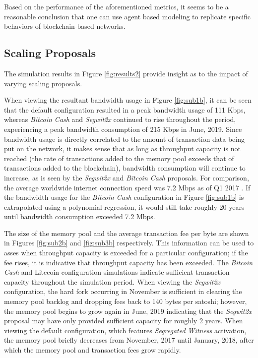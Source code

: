 \documentclass[12pt]{report}
\begin{document}
Based on the performance of the aforementioned metrics, it seems to be a reasonable conclusion that one can use agent based modeling to replicate specific behaviors of blockchain-based networks.

\subsection{Scaling Proposals}
\label{sec:scal}
The simulation results in Figure \ref{fig:results2} provide insight as to the impact of varying scaling proposals.

When viewing the resultant bandwidth usage in Figure \ref{fig:sub1b}, it can be seen that the default configuration resulted in a peak bandwidth usage of 111 Kbps, whereas \textit{Bitcoin Cash} and \textit{Segwit2x} continued to rise throughout the period, experiencing a peak bandwidth consumption of 215 Kbps in June, 2019. Since bandwidth usage is directly correlated to the amount of transaction data being put on the network, it makes sense that as long as throughput capacity is not reached (the rate of transactions added to the memory pool exceeds that of transactions added to the blockchain), bandwidth consumption will continue to increase, as is seen by the \textit{Segwit2x} and \textit{Bitcoin Cash} proposals. For comparison, the average worldwide internet connection speed was 7.2 Mbps as of Q1 2017 \cite{Akamai.2017}. If the bandwidth usage for the \textit{Bitcoin Cash} configuration in Figure \ref{fig:sub1b} is extrapolated using a polynomial regression, it would still take roughly 20 years until bandwidth consumption exceeded 7.2 Mbps.

The size of the memory pool and the average transaction fee per byte are shown in Figures \ref{fig:sub2b} and \ref{fig:sub3b} respectively. This information can be used to asses when throughput capacity is exceeded for a particular configuration; if the fee rises, it is indicative that throughput capacity has been exceeded. The \textit{Bitcoin Cash} and Litecoin configuration simulations indicate sufficient transaction capacity throughout the simulation period. When viewing the \textit{Segwit2x} configuration, the hard fork occurring in November is sufficient in clearing the memory pool backlog and dropping fees back to 140 bytes per satoshi; however, the memory pool begins to grow again in June, 2019 indicating that the \textit{Segwit2x} proposal may have only provided sufficient capacity for roughly 2 years. When viewing the default configuration, which features \textit{Segregated Witness} activation, the memory pool briefly decreases from November, 2017 until January, 2018, after which the memory pool and transaction fees grow rapidly.
\end{document}
